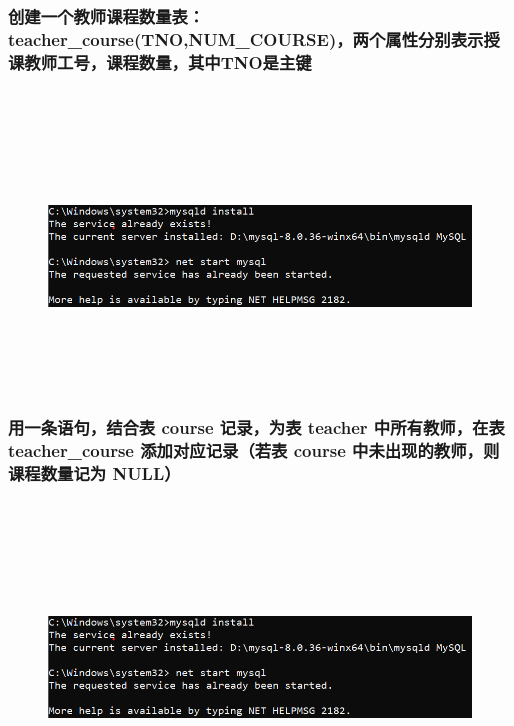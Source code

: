\documentclass{ctexart}
\begin{document}
\subsubsection{创建一个教师课程数量表：teacher\_course(TNO,NUM\_COURSE)，两个属性分别表示授课教师工号，课程数量，其中TNO是主键}
\begin{lstlisting}[language=sql]
	
\end{lstlisting}
\begin{figure}[H]
	\centering 
	\includegraphics[height=7cm,width=14cm]{1.png}
	\end{figure}
\subsubsection{用一条语句，结合表 course 记录，为表 teacher 中所有教师，在表 teacher\_course 添加对应记录（若表 course 中未出现的教师，则课程数量记为 NULL）}
\begin{lstlisting}[language=sql]
	
\end{lstlisting}
\begin{figure}[H]
	\centering 
	\includegraphics[height=7cm,width=14cm]{1.png}
	\end{figure}
\end{document}
